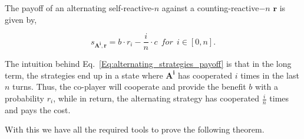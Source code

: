 \documentclass{article}
\theoremstyle{definition}
\begin{document}
The payoff of an alternating self-reactive-$n$ against a counting-reactive$-n$
$\mathbf{r}$ is given by,

\begin{equation}\label{Eq:alternating_strategies_payoff}
  s_{\mathbf{A^{i}}, \mathbf{r}} = b \cdot r_i - \frac{i}{n} \cdot c ~~for~~ i \in [0, n].
\end{equation}

The intuition behind  Eq.~\eqref{Eq:alternating_strategies_payoff} is that in
the long term, the strategies end up in a state where $\mathbf{A^{i}}$ has cooperated $i$ times
in the last $n$ turns. Thus, the co-player will cooperate and provide the benefit
$b$ with a probability $r_i$, while in return, the alternating strategy has
cooperated $\frac{i}{n}$ times and pays the cost.

With this we have all the required tools to prove the following theorem.
\end{document}
